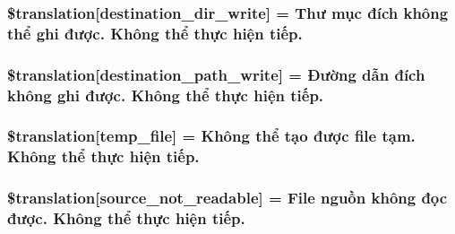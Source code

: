 \subsubsection[{\$translation}]{\setlength{\rightskip}{0pt plus 5cm}\$translation\mbox{[}\textquotesingle{}destination\+\_\+dir\+\_\+write\textquotesingle{}\mbox{]} = \textquotesingle{}Thư mục đích không thể ghi được. Không thể thực hiện tiếp.\textquotesingle{}}\label{class_8upload_8vn___v_n_8php_a97608ea194a616db49141a0e6dee900c}
\hypertarget{class_8upload_8vn___v_n_8php_a40e4e1962226b89fd76da5819a9602b0}{}
\subsubsection[{\$translation}]{\setlength{\rightskip}{0pt plus 5cm}\$translation\mbox{[}\textquotesingle{}destination\+\_\+path\+\_\+write\textquotesingle{}\mbox{]} = \textquotesingle{}Đường dẫn đích không ghi được. Không thể thực hiện tiếp.\textquotesingle{}}\label{class_8upload_8vn___v_n_8php_a40e4e1962226b89fd76da5819a9602b0}
\hypertarget{class_8upload_8vn___v_n_8php_a2baece8da11e20d45175db91851ec3e3}{}
\subsubsection[{\$translation}]{\setlength{\rightskip}{0pt plus 5cm}\$translation\mbox{[}\textquotesingle{}temp\+\_\+file\textquotesingle{}\mbox{]} = \textquotesingle{}Không thể tạo được file tạm. Không thể thực hiện tiếp.\textquotesingle{}}\label{class_8upload_8vn___v_n_8php_a2baece8da11e20d45175db91851ec3e3}
\hypertarget{class_8upload_8vn___v_n_8php_a922967ca2df0efdd455261142d8e5715}{}
\subsubsection[{\$translation}]{\setlength{\rightskip}{0pt plus 5cm}\$translation\mbox{[}\textquotesingle{}source\+\_\+not\+\_\+readable\textquotesingle{}\mbox{]} = \textquotesingle{}File nguồn không đọc được. Không thể thực hiện tiếp.\textquotesingle{}}\label{class_8upload_8vn___v_n_8php_a922967ca2df0efdd455261142d8e5715}
\hypertarget{class_8upload_8vn___v_n_8php_a346dfd1ade29f583dd20d345c436859f}{}
